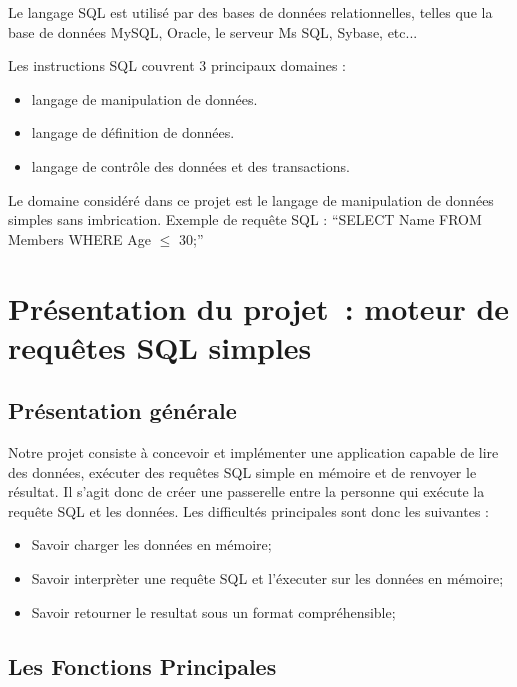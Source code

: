 \documentclass[oneside,13pt,a4paper]{report}
\begin{document}
Le langage SQL est utilisé par des bases de données relationnelles, telles que la base de données MySQL, Oracle, le serveur Ms SQL, Sybase, etc...

Les instructions SQL couvrent 3 principaux domaines :
\begin{itemize}
	\item langage de manipulation de données.
	\item langage de définition de données.
	\item langage de contrôle des données et des transactions.
\end{itemize}
\vspace{0.3cm}

Le domaine considéré dans ce projet est le langage de manipulation de données simples sans imbrication. Exemple de requête SQL : \enquote{SELECT Name FROM Members WHERE Age $ \leq $ 30;}


\chapter{Présentation du projet : moteur de requêtes SQL simples}

\section{Présentation générale}

Notre projet consiste à concevoir et implémenter une application capable de lire des données, exécuter des requêtes SQL simple en mémoire et de renvoyer le résultat. Il s'agit donc de créer une passerelle entre la personne qui exécute la requête SQL et les données. Les difficultés principales sont donc les suivantes :
\vspace{0.3cm}
\begin{itemize}
	\item Savoir charger les données en mémoire;
	\item Savoir interprèter une requête SQL et l'éxecuter sur les données en mémoire;
	\item Savoir retourner le resultat sous un format compréhensible;
\end{itemize}
\vspace{0.3cm}

\section{Les Fonctions Principales}
\end{document}
